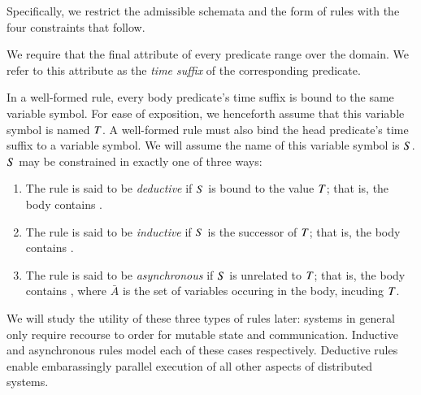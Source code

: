 Specifically, we restrict the admissible schemata and the form of rules with the four constraints that follow.

We require that the final attribute of every \lang predicate range over the  domain.  
We refer to this attribute as the \emph{time suffix} of the corresponding predicate.

%
%
In a well-formed \lang rule, every body predicate's time suffix is bound to the
same variable symbol.  For ease of exposition, we henceforth assume that this
variable symbol is named $\DT$.  A well-formed \lang rule must also bind the head
predicate's time suffix to a variable symbol.  We will assume the name of this
variable symbol is $\DS$.  $\DS$ may be constrained in exactly one of three ways:

\begin{enumerate}
%
\item The rule is said to be {\em deductive} if $\DS$ is bound to the
value $\DT$; that is, the body contains \dedalus{$\DS$ = $\DT$}.
%
\item The rule is said to be {\em inductive} if $\DS$ is the successor of
$\DT$; that is, the body contains .
%
\item The rule is said to be {\em asynchronous} if $\DS$ is unrelated to $\DT$;
that is, the body contains , where $\bar{A}$ is the set of variables occuring in the body, incuding $\DT$.
\end{enumerate}

We will study the utility of these three types of rules later: systems in general only require recourse to order for mutable state and communication.  Inductive and asynchronous rules model each of these cases respectively.  Deductive rules enable embarassingly parallel execution of all other aspects of distributed systems. 

